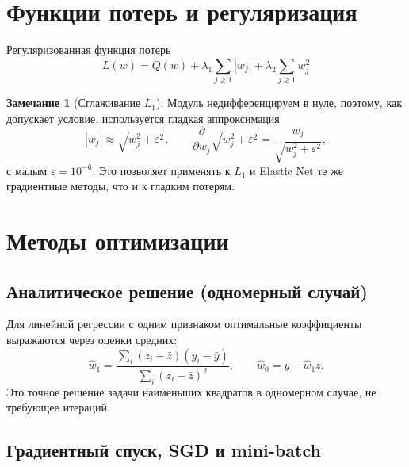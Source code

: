 \documentclass[a4paper,12pt]{article}
\newcommand{\norm}[1]{\left\|#1\right\|}
\newcommand{\grad}{\nabla}
\newcommand{\eps}{\varepsilon}
\theoremstyle{definition}
\newtheorem{remark}{Замечание}[section]
\begin{document}
\section{Функции потерь и регуляризация}

Регуляризованная функция потерь
\[
    L(w) = Q(w) + \lambda_1 \sum_{j \geq 1} |w_j| + \lambda_2 \sum_{j \geq 1} w_j^2
\]

\begin{remark}[Сглаживание $L_1$]
    Модуль недифференцируем в нуле, поэтому, как допускает условие, используется гладкая
    аппроксимация
    \[
        |w_j| \approx \sqrt{w_j^2 + \eps^2}, \qquad
        \frac{\partial}{\partial w_j}\sqrt{w_j^2 + \eps^2} = \frac{w_j}{\sqrt{w_j^2 + \eps^2}},
    \]
    с малым $\eps = 10^{-6}$. Это позволяет применять к $L_1$ и Elastic Net те же градиентные
    методы, что и к гладким потерям.
\end{remark}

\section{Методы оптимизации}\label{sec:methods}

\subsection{Аналитическое решение (одномерный случай)}

Для линейной регрессии с одним признаком оптимальные коэффициенты выражаются через оценки средних:
\[
    \widehat{w}_1 = \frac{\sum_{i} (z_i - \bar{z})(y_i - \bar{y})}{\sum_{i} (z_i - \bar{z})^2},
    \qquad
    \widehat{w}_0 = \bar{y} - \widehat{w}_1 \bar{z}.
\]
Это точное решение задачи наименьших квадратов в одномерном случае, не требующее итераций.

\subsection{Градиентный спуск, SGD и mini-batch}
\end{document}
